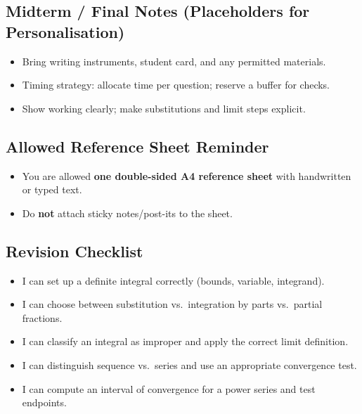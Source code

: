 \documentclass[12pt]{article}
\begin{document}
\subsection{Midterm / Final Notes (Placeholders for Personalisation)}
\begin{itemize}
  \item Bring writing instruments, student card, and any permitted materials.
  \item Timing strategy: allocate time per question; reserve a buffer for checks.
  \item Show working clearly; make substitutions and limit steps explicit.
\end{itemize}

\subsection{Allowed Reference Sheet Reminder}
\begin{itemize}
  \item You are allowed \textbf{one double-sided A4 reference sheet} with handwritten or typed text.
  \item Do \textbf{not} attach sticky notes/post-its to the sheet.
\end{itemize}

\subsection{Revision Checklist}
\begin{itemize}
  \item I can set up a definite integral correctly (bounds, variable, integrand).
  \item I can choose between substitution vs.\ integration by parts vs.\ partial fractions.
  \item I can classify an integral as improper and apply the correct limit definition.
  \item I can distinguish sequence vs.\ series and use an appropriate convergence test.
  \item I can compute an interval of convergence for a power series and test endpoints.
\end{itemize}
\end{document}
